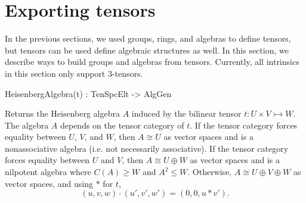 \section{Exporting tensors}

In the previous sections, we used groups, rings, and algebras to define tensors,
but tensors can be used define algebraic structures as well. In this section, we
describe ways to build groups and algebras from tensors. Currently, all
intrinsics in this section only support 3-tensors.

\begin{intrinsics}
HeisenbergAlgebra(t) : TenSpcElt -> AlgGen
\end{intrinsics}

Returns the Heisenberg algebra $A$ induced by the bilinear tensor $t: U\times
V\rightarrowtail W$. The algebra $A$ depends on the tensor category of $t$. If
the tensor category forces equality between $U$, $V$, and $W$, then $A\cong U$
as vector spaces and is a nonassociative algebra (i.e.\! not necessarily
associative). If the tensor category forces equality between $U$ and $V$, then
$A\cong U\oplus W$ as vector spaces and is a nilpotent algebra where $C(A)\geq
W$ and $A^2\leq W$. Otherwise, $A\cong U\oplus V\oplus W$ as vector spaces, and
using $*$ for $t$, 
\[ (u,v,w)\cdot (u',v',w') = (0,0,u*v'). \]

